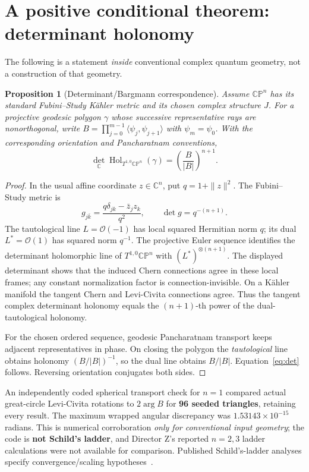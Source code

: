\documentclass[10pt,letterpaper]{article}
\theoremstyle{plain}\newtheorem{theorem}{Theorem}\newtheorem{proposition}{Proposition}
\theoremstyle{definition}\newtheorem{remark}{Remark}
\begin{document}
\section{A positive conditional theorem: determinant holonomy}
The following is a statement \emph{inside} conventional complex quantum geometry, not a construction of that geometry.
\begin{proposition}[Determinant/Bargmann correspondence]
Assume $\mathbb{CP}^n$ has its standard Fubini--Study K\"ahler metric and its \emph{chosen} complex structure $J$. For a projective geodesic polygon $\gamma$ whose successive representative rays are nonorthogonal, write $B=\prod_{j=0}^{m-1}\langle\psi_j,\psi_{j+1}\rangle$ with $\psi_m=\psi_0$. With the corresponding orientation and Pancharatnam conventions,
\begin{equation}
\boxed{\displaystyle
\det_{\mathbb C}\operatorname{Hol}_{T^{1,0}\mathbb{CP}^{n}}(\gamma)
 =\left(\frac B{|B|}\right)^{n+1}.}
\label{eq:det}
\end{equation}
\end{proposition}
\begin{proof}
In the usual affine coordinate $z\in\mathbb C^n$, put $q=1+\|z\|^2$. The Fubini--Study metric is
\[
g_{j\bar k}=\frac{q\delta_{jk}-\bar z_jz_k}{q^2},
\qquad \det g=q^{-(n+1)}.
\]
The tautological line $L=\mathcal O(-1)$ has local squared Hermitian norm $q$; its dual $L^*=\mathcal O(1)$ has squared norm $q^{-1}$. The projective Euler sequence identifies the determinant holomorphic line of $T^{1,0}\mathbb{CP}^n$ with $(L^*)^{\otimes(n+1)}$. The displayed determinant shows that the induced Chern connections agree in these local frames; any constant normalization factor is connection-invisible. On a K\"ahler manifold the tangent Chern and Levi-Civita connections agree. Thus the tangent complex determinant holonomy equals the $(n+1)$-th power of the dual-tautological holonomy.

For the chosen ordered sequence, geodesic Pancharatnam transport keeps adjacent representatives in phase. On closing the polygon the \emph{tautological} line obtains holonomy $(B/|B|)^{-1}$, so the dual line obtains $B/|B|$. Equation~\eqref{eq:det} follows. Reversing orientation conjugates both sides.
\end{proof}
An independently coded spherical transport check for $n=1$ compared actual great-circle Levi-Civita rotations to $2\arg B$ for \textbf{96 seeded triangles}, retaining every result. The maximum wrapped angular discrepancy was $1.53143\times10^{-15}$ radians. This is numerical corroboration \emph{only for conventional input geometry}; the code is \textbf{not Schild's ladder}, and Director Z's reported $n=2,3$ ladder calculations were not available for comparison. Published Schild's-ladder analyses specify convergence/scaling hypotheses~\cite{Guigui2022}.
\end{document}
